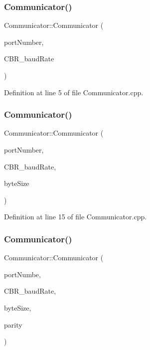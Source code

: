\subsubsection{\texorpdfstring{Communicator()}{Communicator()}\hspace{0.1cm}{\footnotesize\ttfamily [1/3]}}
{\footnotesize\ttfamily Communicator\+::\+Communicator (\begin{DoxyParamCaption}\item[{uint8\+\_\+t}]{port\+Number,  }\item[{D\+W\+O\+RD}]{C\+B\+R\+\_\+baud\+Rate }\end{DoxyParamCaption})}



Definition at line 5 of file Communicator.\+cpp.

\mbox{\label{class_communicator_ac3274a4f40c669f4db2e7fe4f239d018}} 
\subsubsection{\texorpdfstring{Communicator()}{Communicator()}\hspace{0.1cm}{\footnotesize\ttfamily [2/3]}}
{\footnotesize\ttfamily Communicator\+::\+Communicator (\begin{DoxyParamCaption}\item[{uint8\+\_\+t}]{port\+Number,  }\item[{D\+W\+O\+RD}]{C\+B\+R\+\_\+baud\+Rate,  }\item[{byte}]{byte\+Size }\end{DoxyParamCaption})}



Definition at line 15 of file Communicator.\+cpp.

\mbox{\label{class_communicator_a86b21e90bb3c1c8afedcc2c1e523c79c}} 
\subsubsection{\texorpdfstring{Communicator()}{Communicator()}\hspace{0.1cm}{\footnotesize\ttfamily [3/3]}}
{\footnotesize\ttfamily Communicator\+::\+Communicator (\begin{DoxyParamCaption}\item[{uint8\+\_\+t}]{port\+Numbe,  }\item[{D\+W\+O\+RD}]{C\+B\+R\+\_\+baud\+Rate,  }\item[{byte}]{byte\+Size,  }\item[{byte}]{parity }\end{DoxyParamCaption})}



